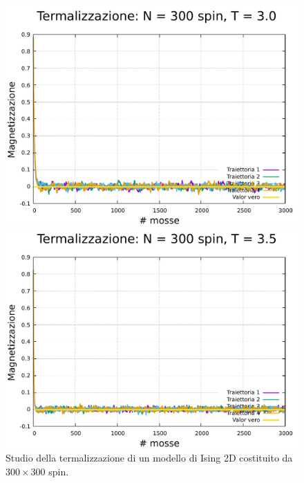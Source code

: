 \begin{figure}[htbp]
    \begin{minipage}{0.45\textwidth}  
      \centering
      \includegraphics[page=1, width=\textwidth]{Immagini/simIsing2D/metro/term/term_300_3.0.pdf}
      \caption{$T\,=\,3.0$}
    \end{minipage}\hfill
    \begin{minipage}{0.45\textwidth}  
      \centering
      \includegraphics[page=1, width=\textwidth]{Immagini/simIsing2D/metro/term/term_300_3.5.pdf}
      \caption{$T\,=\,3.5$}
    \end{minipage}
    \caption{Studio della termalizzazione di un modello di Ising 2D costituito da $300 \times 300$ spin.}
\end{figure}

